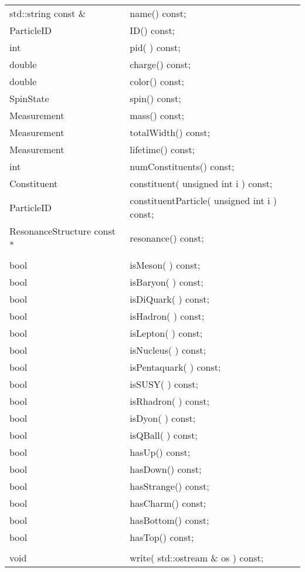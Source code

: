 \begin{center}
\begin{tabular}{ll}
  std::string const \&         & name()        const;  \\    
  ParticleID                  & ID()          const; \\
  int                         & pid( )        const; \\
  double                      & charge()      const; \\
  double                      & color()       const; \\
  SpinState                   & spin()        const; \\
  Measurement                 & mass()        const; \\
  Measurement                 & totalWidth()  const; \\
  Measurement                 & lifetime()    const; \\
  int                         & numConstituents() const; \\
   Constituent          & constituent( unsigned int i ) const; \\
   ParticleID           & constituentParticle( unsigned int i ) const; \\
  ResonanceStructure const *  & resonance()   const; \\
 \\
  bool & isMeson( )   const; \\
  bool & isBaryon( )  const; \\
  bool & isDiQuark( ) const; \\
  bool & isHadron( )  const; \\
  bool & isLepton( )  const; \\
  bool & isNucleus( ) const; \\
  bool & isPentaquark( )  const; \\
  bool & isSUSY( )  const; \\
  bool & isRhadron( )  const; \\
  bool & isDyon( )  const; \\
  bool & isQBall( )  const; \\
  bool & hasUp()      const; \\
  bool & hasDown()    const; \\
  bool & hasStrange() const; \\
  bool & hasCharm()   const; \\
  bool & hasBottom()  const; \\
  bool & hasTop()     const; \\
   \\
   void & write( std::ostream \& os ) const; \\
\end{tabular}
\end{center}

